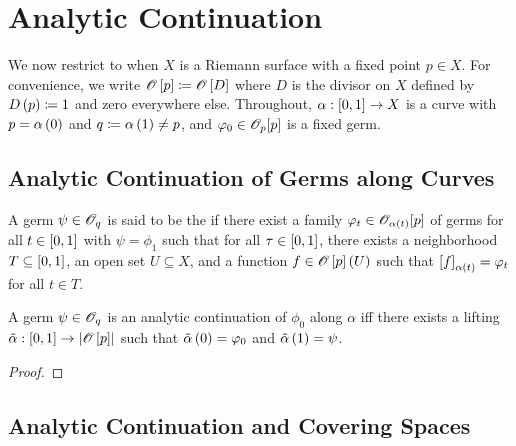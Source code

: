 \documentclass[../Moduli_Spaces_of_Riemann_Surfaces.tex]{subfiles}
\begin{document}
    \section{Analytic Continuation}
    We now restrict to when $X$ is a Riemann surface with a fixed point $p\in X$. For convenience, we write $\mathscr{O}\left[p\right]\coloneqq\mathscr{O}\left[D\right]$ where $D$ is the divisor on $X$ defined by $D\left(p\right)\coloneqq1$ and zero everywhere else. Throughout, $\alpha:\left[0,1\right]\to X$ is a curve with $p=\alpha\left(0\right)$ and $q\coloneqq\alpha\left(1\right)\neq p$, and $\varphi_0\in\mathscr{O}_p\!\left[p\right]$ is a fixed germ.
    \subsection{Analytic Continuation of Germs along Curves}
    \begin{definition}
        A germ $\psi\in\mathscr{O}_q$ is said to be the  if there exist a family $\varphi_t\in\mathscr{O}_{\alpha\left(t\right)}\!\left[p\right]$ of germs for all $t\in\left[0,1\right]$ with $\psi=\phi_1$ such that for all $\tau\in\left[0,1\right]$, there exists a neighborhood $T\subseteq\left[0,1\right]$, an open set $U\subseteq X$, and a function $f\in\mathscr{O}\left[p\right]\left(U\right)$ such that $\left[f\right]_{\alpha\left(t\right)}=\varphi_t$ for all $t\in T$.
    \end{definition}
    \begin{proposition}
        A germ $\psi\in\mathscr{O}_q$ is an analytic continuation of $\phi_0$ along $\alpha$ iff there exists a lifting $\tilde{\alpha}:\left[0,1\right]\to\left|\mathscr{O}\left[p\right]\right|$ such that $\tilde{\alpha}\left(0\right)=\varphi_0$ and $\tilde{\alpha}\left(1\right)=\psi$.
    \end{proposition}
    \begin{proof}
        
    \end{proof}
    \subsection{Analytic Continuation and Covering Spaces}
\end{document}
